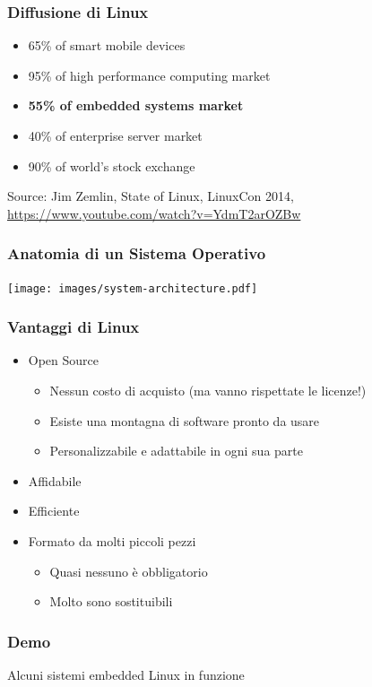 \documentclass[xetex,table]{beamer}
\begin{document}
\begin{frame}
\frametitle{Diffusione di Linux}
  \begin{itemize}
    \item 65\% of smart mobile devices
    \item 95\% of high performance computing market
    \item \textbf{55\% of embedded systems market}
    \item 40\% of enterprise server market
    \item 90\% of world’s stock exchange
  \end{itemize}
  {\tiny Source: Jim Zemlin, State of Linux, LinuxCon 2014,
    \url{https://www.youtube.com/watch?v=YdmT2arOZBw}}
\end{frame}

\begin{frame}
\frametitle{Anatomia di un Sistema Operativo}
  \begin{center}
    \texttt{[image: images/system-architecture.pdf]}
  \end{center}
\end{frame}

\begin{frame}
\frametitle{Vantaggi di Linux}
  \begin{itemize}
    \item Open Source
    \begin{itemize}
      \item Nessun costo di acquisto (ma vanno rispettate le licenze!)
      \item Esiste una montagna di software pronto da usare
      \item Personalizzabile e adattabile in ogni sua parte
    \end{itemize}
    \item Affidabile
    \item Efficiente
    \item Formato da molti piccoli pezzi
    \begin{itemize}
      \item Quasi nessuno è obbligatorio
      \item Molto sono sostituibili
    \end{itemize}
  \end{itemize}
\end{frame}

\begin{frame}
\frametitle[Demo! Alcuni sistemi Linux embedded in funzione]{Demo}
  \begin{center}
    \LARGE
    Alcuni sistemi embedded Linux in funzione
  \end{center}
\end{frame}
\end{document}
